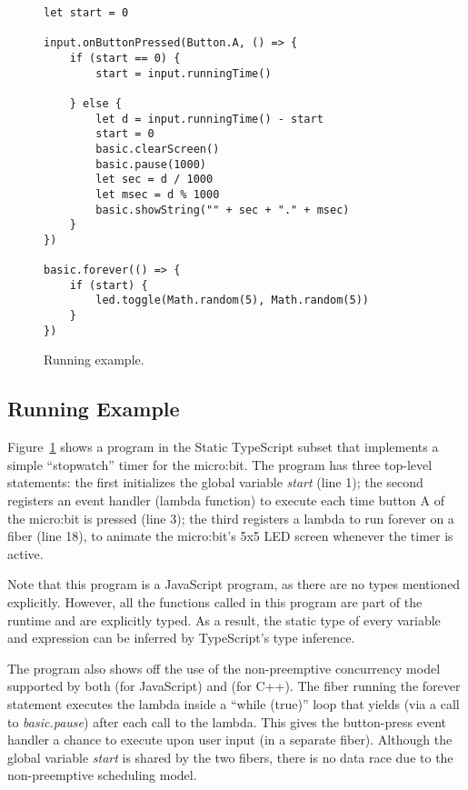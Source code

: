 
\begin{figure}
\begin{lstlisting}
let start = 0

input.onButtonPressed(Button.A, () => {
    if (start == 0) {
        start = input.runningTime()

    } else {
        let d = input.runningTime() - start
        start = 0
        basic.clearScreen()
        basic.pause(1000)
        let sec = d / 1000
        let msec = d % 1000
        basic.showString("" + sec + "." + msec)
    }
})

basic.forever(() => {
    if (start) {
        led.toggle(Math.random(5), Math.random(5))
    }
})
\end{lstlisting}
\caption{\label{fig:example}Running example.}
\end{figure}

\subsection{Running Example}

Figure~\ref{fig:example} shows a program in the Static
TypeScript subset that implements a simple ``stopwatch'' timer
for the micro:bit.
The program has three top-level statements:
the first initializes the global variable \emph{start} (line 1); the
second registers an event handler (lambda function) to execute
each time button A of the micro:bit is pressed (line 3); the
third registers a lambda to run forever on a fiber (line 18),
to animate the micro:bit's 5x5 LED screen whenever the timer is active. 

Note that this program is a JavaScript program, as there are no 
types mentioned explicitly. However, all the functions called in
this program are part of the runtime and are explicitly
typed.  As a result, the static type of every variable and expression
can be inferred by TypeScript's type inference.

The program also shows off the use of the non-preemptive concurrency
model supported by both \MC (for JavaScript) and \CO (for C++). 
The fiber running the forever statement executes the lambda inside a ``while (true)'' 
loop that yields (via a call to \emph{basic.pause}) after each call to the lambda.
This gives the button-press event handler a chance to execute
upon user input (in a separate fiber). Although the global variable \emph{start} is 
shared by the two fibers, there is no data race due to the non-preemptive 
scheduling model. 


